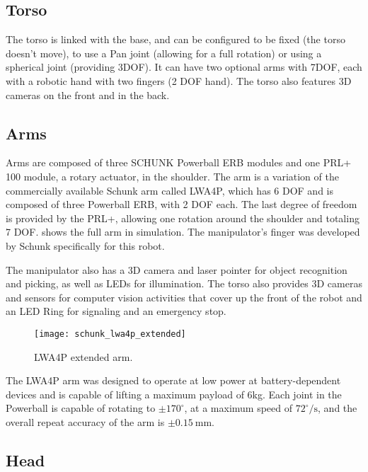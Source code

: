 \subsection{Torso}

The torso is linked with the base, and can be configured to be fixed (the torso doesn't move), to use a Pan joint (allowing for a full rotation) or using a spherical joint (providing 3DOF). It can have two optional arms with 7DOF, each with a robotic hand with two fingers (2 DOF hand). The torso also features 3D cameras on the front and in the back.

\subsection{Arms}

Arms are composed of three SCHUNK Powerball ERB modules and one PRL+ 100 module, a rotary actuator, in the shoulder. The arm is a variation of the commercially available Schunk arm called LWA4P, which has 6 DOF and is composed of three Powerball ERB, with 2 DOF each. The last degree of freedom is provided by the PRL+, allowing one rotation around the shoulder and totaling 7 DOF.  shows the full arm in simulation. The manipulator's finger was developed by Schunk specifically for this robot.

The manipulator also has a 3D camera and laser pointer for object recognition and picking, as well as LEDs for illumination. The torso also provides 3D cameras and sensors for computer vision activities that cover up the front of the robot and an LED Ring for signaling and an emergency stop.

\begin{figure}[!ht]
    \centering
    \texttt{[image: schunk\_lwa4p\_extended]}
    \caption{LWA4P extended arm.}
    \label{fig:schunk_lwa4p_extended}
\end{figure}

The LWA4P arm was designed to operate at low power at battery-dependent devices and is capable of lifting a maximum payload of 6kg. Each joint in the Powerball is capable of rotating to $\pm 170^\circ$, at a maximum speed of $72^\circ /\text{s}$, and the overall repeat accuracy of the arm is $\pm 0.15 \ \text{mm}$.


\subsection{Head}

